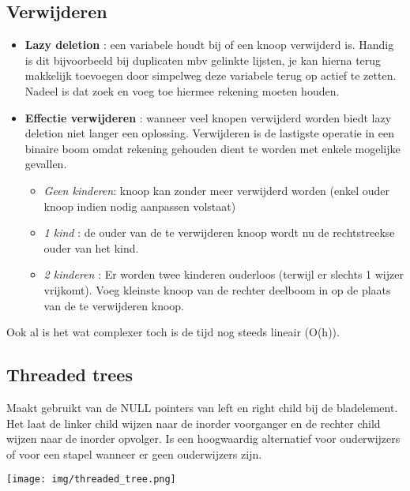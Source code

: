 \documentclass[11pt]{article}
\begin{document}
\subsection{Verwijderen}
\begin{itemize}
	\item \textbf{Lazy deletion} : een variabele houdt bij of een knoop verwijderd is. Handig is dit bijvoorbeeld bij duplicaten mbv gelinkte lijsten, je kan hierna terug makkelijk toevoegen door simpelweg deze variabele terug op actief te zetten. Nadeel is dat zoek en voeg toe hiermee rekening moeten houden.
	\item \textbf{Effectie verwijderen} : wanneer veel knopen verwijderd worden biedt lazy deletion niet langer een oplossing. Verwijderen is de lastigste operatie in een binaire boom omdat rekening gehouden dient te worden met enkele mogelijke gevallen.
		\begin{itemize}
			\item \emph{Geen kinderen}: knoop kan zonder meer verwijderd worden (enkel ouder knoop indien nodig aanpassen volstaat)
			\item \emph{1 kind }: de ouder van de te verwijderen knoop wordt nu de rechtstreekse ouder van het kind.
			\item \emph{2 kinderen } : Er worden twee kinderen ouderloos (terwijl er slechts 1 wijzer vrijkomt). Voeg kleinste knoop van de rechter deelboom in op de plaats van de te verwijderen knoop.
		\end{itemize}
\end{itemize}

Ook al is het wat complexer toch is de tijd nog steeds lineair (O(h)).

\subsection{Threaded trees}
Maakt gebruikt van de NULL pointers van left en right child bij de bladelement. Het laat de linker child wijzen naar de inorder voorganger en de rechter child wijzen naar de inorder opvolger. Is een hoogwaardig alternatief voor ouderwijzers of voor een stapel wanneer er geen ouderwijzers zijn.
\begin{center}
\texttt{[image: img/threaded\_tree.png]}
\end{center}
\end{document}
